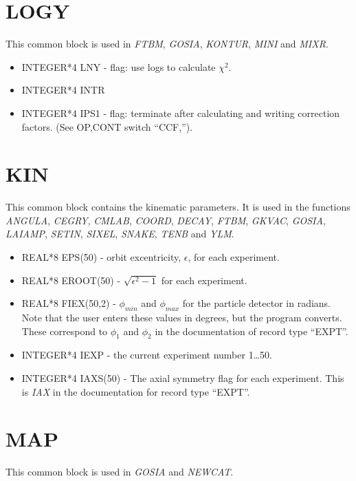 \section{LOGY}

This common block is used in {\em FTBM}, {\em GOSIA}, {\em KONTUR}, {\em
MINI} and {\em MIXR}.

\begin{itemize}
\item INTEGER*4 LNY - flag: use logs to calculate $\chi^2$.
\item INTEGER*4 INTR
\item INTEGER*4 IPS1 - flag: terminate after calculating and writing
correction factors. (See OP,CONT switch ``CCF,'').
\end{itemize}

\section{KIN}

This common block contains the kinematic parameters. It is used in the
functions {\em ANGULA}, {\em CEGRY}, {\em CMLAB}, {\em COORD}, {\em DECAY},
{\em FTBM}, {\em GKVAC}, {\em GOSIA}, {\em LAIAMP}, {\em SETIN}, {\em
SIXEL}, {\em SNAKE}, {\em TENB} and {\em YLM}.

\begin{itemize}
\item REAL*8 EPS(50) - orbit excentricity, $\epsilon$, for each experiment.
\item REAL*8 EROOT(50) - $\sqrt{\epsilon^2 -1}$ for each experiment.
\item REAL*8 FIEX(50,2) - $\phi_{min}$ and $\phi_{max}$ for the particle
detector in radians. Note that the user enters these values in degrees, but
the program converts. These correspond to $\phi_1$ and $\phi_2$ in the
documentation of record type ``EXPT''.
\item INTEGER*4 IEXP - the current experiment number 1{\ldots}50.
\item INTEGER*4 IAXS(50) - The axial symmetry flag for each experiment. This
is {\em IAX} in the documentation for record type ``EXPT''.
\end{itemize}

\section{MAP}

This common block is used in {\em GOSIA} and {\em NEWCAT}.

